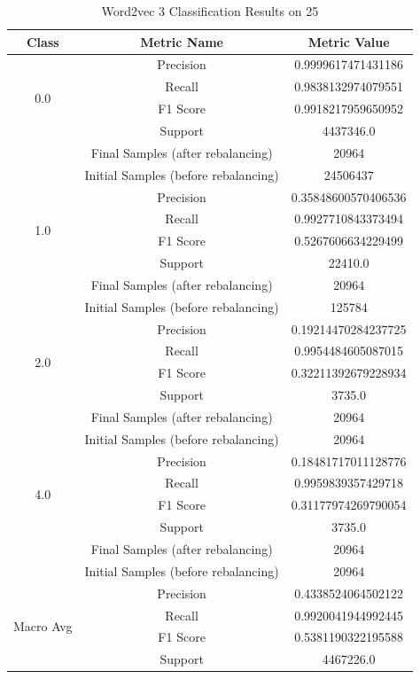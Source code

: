 \begin{longtable}{|c|c|c|}
\caption{Word2vec 3 Classification Results on 25} \label{tab:25_word2vec_3_classifiers_results} \\
\hline
Class & Metric Name & Metric Value \\
\hline
\multirow{4}{*}{0.0} & Precision & 0.9999617471431186 \\
 & Recall & 0.9838132974079551 \\
 & F1 Score & 0.9918217959650952 \\
 & Support & 4437346.0 \\
 & Final Samples (after rebalancing) & 20964 \\
 & Initial Samples (before rebalancing) & 24506437 \\
\hline
\multirow{4}{*}{1.0} & Precision & 0.35848600570406536 \\
 & Recall & 0.9927710843373494 \\
 & F1 Score & 0.5267606634229499 \\
 & Support & 22410.0 \\
 & Final Samples (after rebalancing) & 20964 \\
 & Initial Samples (before rebalancing) & 125784 \\
\hline
\multirow{4}{*}{2.0} & Precision & 0.19214470284237725 \\
 & Recall & 0.9954484605087015 \\
 & F1 Score & 0.32211392679228934 \\
 & Support & 3735.0 \\
 & Final Samples (after rebalancing) & 20964 \\
 & Initial Samples (before rebalancing) & 20964 \\
\hline
\multirow{4}{*}{4.0} & Precision & 0.18481717011128776 \\
 & Recall & 0.9959839357429718 \\
 & F1 Score & 0.31177974269790054 \\
 & Support & 3735.0 \\
 & Final Samples (after rebalancing) & 20964 \\
 & Initial Samples (before rebalancing) & 20964 \\
\hline
\multirow{4}{*}{Macro Avg} & Precision & 0.4338524064502122 \\
 & Recall & 0.9920041944992445 \\
 & F1 Score & 0.5381190322195588 \\
 & Support & 4467226.0 \\

\end{longtable}

